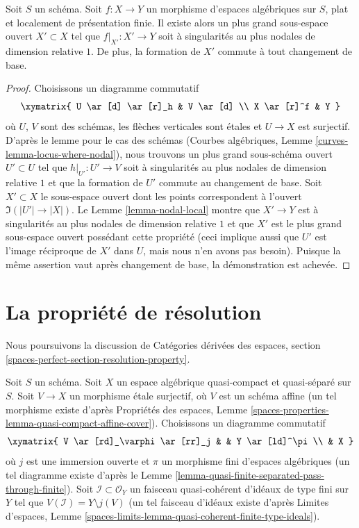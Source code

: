 \begin{lemma}
\label{lemma-locus-where-nodal}
Soit $S$ un schéma.
Soit $f : X \to Y$ un morphisme d'espaces algébriques sur $S$,
plat et localement de présentation finie. Il existe alors
un plus grand sous-espace ouvert $X' \subset X$ tel que $f|_{X'} : X' \to Y$
soit à singularités au plus nodales de dimension relative $1$. De plus, la formation
de $X'$ commute à tout changement de base.
\end{lemma}

\begin{proof}
Choisissons un diagramme commutatif
$$
\xymatrix{
U \ar[d] \ar[r]_h & V \ar[d] \\
X \ar[r]^f & Y
}
$$
où $U$, $V$ sont des schémas, les flèches verticales sont \'etales et
$U \to X$ est surjectif. D'après le lemme pour le cas des schémas
(Courbes algébriques, Lemme \ref{curves-lemma-locus-where-nodal}),
nous trouvons un plus grand sous-schéma ouvert $U' \subset U$
tel que $h|_{U'} : U' \to V$ soit à singularités au plus nodales de dimension relative $1$
et que la formation de $U'$ commute au changement de base.
Soit $X' \subset X$ le sous-espace ouvert dont les points correspondent
à l'ouvert $\Im(|U'| \to |X|)$.
Le Lemme \ref{lemma-nodal-local} montre que $X' \to Y$ est
à singularités au plus nodales de dimension relative $1$ et que $X'$ est le
plus grand sous-espace ouvert possédant cette propriété (ceci implique aussi
que $U'$ est l'image réciproque de $X'$ dans $U$, mais nous n'en avons
pas besoin). Puisque la même assertion vaut après changement de base,
la démonstration est achevée.
\end{proof}




\section{La propriété de résolution}
\label{section-resolution-property}

\noindent
Nous poursuivons la discussion de Catégories dérivées des espaces, section
\ref{spaces-perfect-section-resolution-property}.

\begin{situation}
\label{situation-descend-resolution-property}
Soit $S$ un schéma. Soit $X$ un espace algébrique quasi-compact et quasi-séparé
sur $S$. Soit $V \to X$ un morphisme \'etale surjectif,
où $V$ est un schéma affine (un tel morphisme existe d'après
Propriétés des espaces, Lemme
\ref{spaces-properties-lemma-quasi-compact-affine-cover}).
Choisissons un diagramme commutatif
$$
\xymatrix{
V \ar[rd]_\varphi \ar[rr]_j & & Y \ar[ld]^\pi \\
& X
}
$$
où $j$ est une immersion ouverte et $\pi$ un morphisme fini
d'espaces algébriques (un tel diagramme existe d'après
le Lemme \ref{lemma-quasi-finite-separated-pass-through-finite}).
Soit $\mathcal{I} \subset \mathcal{O}_Y$ un faisceau quasi-cohérent d'idéaux
de type fini sur $Y$ tel que
$V(\mathcal{I}) = Y \setminus j(V)$ (un tel faisceau d'idéaux existe
d'après Limites d'espaces, Lemme
\ref{spaces-limits-lemma-quasi-coherent-finite-type-ideals}).
\end{situation}

